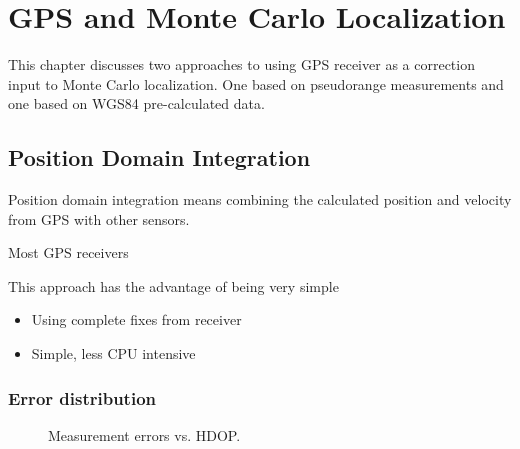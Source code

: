 \chapter{GPS and Monte Carlo Localization}
\label{chap:gps_and_mcl}

This chapter discusses two approaches to using GPS receiver as a correction input
to Monte Carlo localization. One based on pseudorange measurements and one based on
WGS84 pre-calculated data.



\section{Position Domain Integration}
Position domain integration means combining the calculated position and velocity from
GPS with other sensors.

Most GPS receivers 

This approach has the advantage of being very simple 

\begin{itemize}
\item Using complete fixes from receiver
\item Simple, less CPU intensive
\end{itemize}

\subsection{Error distribution}

\begin{figure}[ht]
	\label{fig:wgs84_hdop_error}
	\centering
	
	\caption{Measurement errors vs. HDOP.}

\end{figure}


